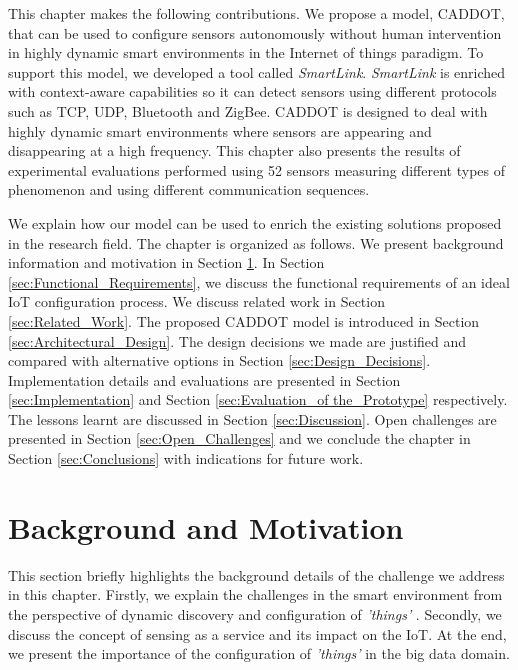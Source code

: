 \documentclass[graybox]{svmult}
\newcommand{\things}{\textit{'things' }}
\begin{document}
This chapter makes the following contributions. We propose a model, CADDOT, that can be used to configure sensors autonomously without human intervention in highly dynamic smart environments in the Internet of things paradigm. To support this model, we developed a tool called \textit{SmartLink}. \textit{SmartLink} is enriched with context-aware capabilities so it can detect sensors using  different protocols such as TCP, UDP, Bluetooth and ZigBee.  CADDOT is designed to deal with highly dynamic smart environments where sensors are appearing and disappearing at a high frequency. This chapter also presents the results of experimental evaluations performed using 52 sensors measuring different types of phenomenon and using different communication sequences.


We explain how our model can be used to enrich the existing solutions proposed in the research field. The chapter is organized as follows. We present background information and motivation in Section \ref{sec:Background}. In Section \ref{sec:Functional_Requirements}, we discuss the functional requirements of an ideal IoT configuration process. We discuss related work in Section \ref{sec:Related_Work}. The proposed CADDOT model is introduced in Section \ref{sec:Architectural_Design}. The design decisions we made are justified and compared with alternative options in Section \ref{sec:Design_Decisions}. Implementation details and evaluations are presented in Section \ref{sec:Implementation} and Section \ref{sec:Evaluation_of the_Prototype} respectively. The lessons learnt are discussed in Section \ref{sec:Discussion}. Open challenges are presented in Section \ref{sec:Open_Challenges} and we conclude the chapter in Section \ref{sec:Conclusions} with indications for future work.












\section{Background and Motivation}
\label{sec:Background}

This section briefly highlights the background details of the challenge we address in this chapter. Firstly, we explain the challenges in the smart environment from the perspective of dynamic discovery and configuration of \things. Secondly, we discuss the concept of sensing as a service and its impact on the IoT. At the end, we present the importance of the configuration of \things in the big data domain.
\end{document}

